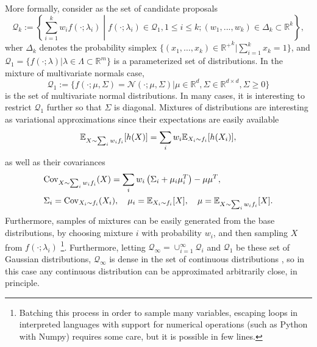 More formally, consider as the set of candidate proposals 
\begin{equation}
\mathcal{Q}_k := \left\{\sum_{i=1}^k w_i f(\cdot;\lambda_i) \middle| f(\cdot;\lambda_i) \in \mathcal{Q}_1, 1 \leq i \leq k; (w_1,...,w_k) \in \Delta_k \subset \mathbb{R}^k \right\},
\end{equation}
wher $\Delta_k$ denotes the probability simplex $\{(x_1,\ldots,x_k) \in {\mathbb{R}^+}^k| \sum_{i=1}^k x_k = 1\}$, and $\mathcal{Q}_1 = \{f(\cdot;\lambda) | \lambda \in \Lambda \subset \mathbb{R}^m\}$ is a parameterized set of distributions. In the mixture of multivariate normals case,
\begin{equation}
\mathcal{Q}_1 := \{f(\cdot ; \mu,\Sigma) = \mathcal{N}(\cdot;\mu,\Sigma) | \mu \in \mathbb{R}^d,\Sigma \in \mathbb{R}^{d \times d}, \Sigma \geq 0\} 
\end{equation}
is the set of multivariate normal distributions. In many cases, it is interesting to restrict $\mathcal{Q}_1$ further so that $\Sigma$ is diagonal.
Mixtures of distributions are interesting as variational approximations since their expectations are easily available 
\begin{equation}
{\mathbb E}_{X \sim \sum_i w_i f_i} [h(X)] = \sum_i w_i {\mathbb E}_{X_i \sim f_i} [h(X_i)],
\end{equation}
as well as their covariances
\begin{equation}
\begin{split}
& \mathrm{Cov}_{X \sim \sum_i w_i f_i}(X) = \sum_i w_i \left( \Sigma_i +   \mu_i \mu_i^T \right) - \mu \mu^T, \\
& \Sigma_i = \mathrm{Cov}_{X_i \sim f_i}(X_i), \quad \mu_i = {\mathbb E}_{X_i \sim f_i}[X], \quad \mu = {\mathbb E}_{X \sim \sum_i w_i f_i} [X].
\end{split}
\end{equation}
Furthermore, samples of mixtures can be easily generated from the base distributions, by choosing mixture $i$ with probability $w_i$, and then sampling $X$ from $f(\cdot;\lambda_i)$ \footnote{Batching this process in order to sample many variables, escaping loops in interpreted languages with support for numerical operations (such as Python with Numpy) requires some care, but it is possible in few lines.}. Furthermore, letting $\mathcal{Q}_\infty = \cup_{i=1}^\infty \mathcal{Q}_i$ and $\mathcal{Q}_1$ be these set of Gaussian distributions, $\mathcal{Q}_\infty$ is dense in the set of continuous distributions \cite{Epanechnikov_1969}, so in this case any continuous distribution can be approximated arbitrarily close, in principle.

